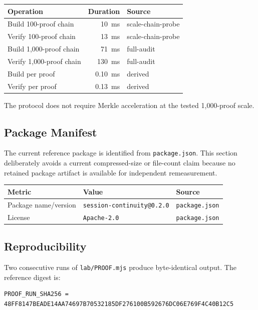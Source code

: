 \documentclass[11pt,a4paper]{article}
\begin{document}
\begin{table}[h]
\centering
\begin{tabular}{@{}lrl@{}}
\toprule
Operation & Duration & Source \\
\midrule
Build 100-proof chain & 10~ms & scale-chain-probe \\
Verify 100-proof chain & 13~ms & scale-chain-probe \\
Build 1{,}000-proof chain & 71~ms & full-audit \\
Verify 1{,}000-proof chain & 130~ms & full-audit \\
Build per proof & 0.10~ms & derived \\
Verify per proof & 0.13~ms & derived \\
\bottomrule
\end{tabular}
\end{table}

The protocol does not require Merkle acceleration at the tested 1{,}000-proof scale.

\subsection{Package Manifest}

The current reference package is identified from \texttt{package.json}. This section deliberately avoids a current compressed-size or file-count claim because no retained package artifact is available for independent remeasurement.

\begin{table}[h]
\centering
\begin{tabular}{lll}
\toprule
Metric & Value & Source \\
\midrule
Package name/version & \texttt{session-continuity@0.2.0} & \texttt{package.json} \\
License & \texttt{Apache-2.0} & \texttt{package.json} \\
\bottomrule
\end{tabular}
\end{table}

\subsection{Reproducibility}

Two consecutive runs of \texttt{lab/PROOF.mjs} produce byte-identical output. The reference digest is:

\begin{lstlisting}
PROOF_RUN_SHA256 = 48FF8147BEADE14AA74697B70532185DF276100B592676DC06E769F4C40B12C5
\end{lstlisting}
\end{document}
